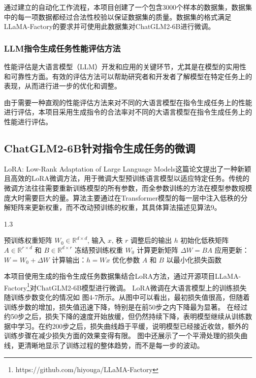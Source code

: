 \documentclass[a4paper,AutoFakeBold,oneside,12pt]{book}
\begin{document}
通过建立的自动化工作流程，本项目创建了一个包含3000个样本的数据集，数据集中的每一项数据都经过合法性校验以保证数据集的质量。数据集的格式满足LLaMA-Factory的要求并可使用此数据集对ChatGLM2-6B进行微调。
\subsubsection{LLM指令生成任务性能评估方法}
性能评估是大语言模型（LLM）开发和应用的关键环节，尤其是在模型的实用性和可靠性方面。有效的评估方法可以帮助研究者和开发者了解模型在特定任务上的表现，从而进行进一步的优化和调整。

由于需要一种直观的性能评估方法来对不同的大语言模型在指令生成任务上的性能进行评估，本项目采用生成指令的合法率对不同的大语言模型在指令生成任务上的性能进行评估。


\subsection{ChatGLM2-6B针对指令生成任务的微调}
LoRA: Low-Rank Adaptation of Large Language Models\cite{hu2021lora}这篇论文提出了一种新颖且高效的LoRA微调方法，用于微调大型预训练语言模型以适应特定任务。传统的微调方法往往需要重新训练模型的所有参数，而全参数训练的方法在模型参数规模庞大时需要巨大的量。算法主要通过在Transformer模型的每一层中注入低秩的分解矩阵来更新权重，而不改动预训练的权重，其具体算法描述见算法9。
\begin{algorithm}
	\begin{spacing}{1.3}
		\caption{LoRA: 大型语言模型的低秩适配} 
		\label{LoRA_model}
		\renewcommand{\algorithmicrequire}{\textbf{输入：}}
		\renewcommand{\algorithmicensure}{\textbf{输出：}} 
			\begin{algorithmic}[1] 
				\Require 预训练权重矩阵 $W_0 \in \mathbb{R}^{d \times d}$, 输入 $x$, 秩 $r$
				\Ensure 调整后的输出 $h$
				\State 初始化低秩矩阵 $A \in \mathbb{R}^{r \times d}$ 和 $B \in \mathbb{R}^{d \times r}$
				\State 冻结预训练权重 $W_0$
				    \State 计算更新矩阵 $\Delta W = BA$
				    \State 应用更新：$W = W_0 + \Delta W$
				    \State 计算输出：$h = Wx$
				\EndFor
				\State 优化参数 $A$ 和 $B$ 以最小化损失函数
			\end{algorithmic}
	\end{spacing}
\end{algorithm}


本项目使用生成的指令生成任务数据集结合LoRA方法，通过开源项目LLaMA-Factory\footnote{https://github.com/hiyouga/LLaMA-Factory}对ChatGLM2-6B模型进行微调。
LoRA微调在大语言模型上的训练损失随训练步数变化的情况如 图4-7所示。从图中可以看出，最初损失值很高，但随着训练步数的增加，损失值迅速下降，特别是在前50步之内下降最为显著。
在经过约50步之后，损失下降的速度开始放缓，但仍然持续下降，表明模型继续从训练数据中学习。在约200步之后，损失曲线趋于平缓，说明模型已经接近收敛，额外的训练步骤在减少损失方面的效果变得有限。
图中还展示了一个平滑处理的损失曲线，更清晰地显示了训练过程的整体趋势，而不是每一步的波动。
\end{document}
